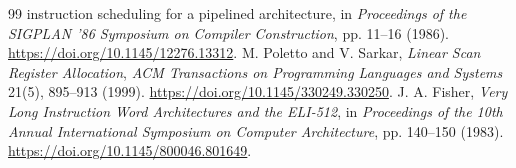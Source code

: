 \documentclass[11pt,a4paper]{article}
\begin{document}
\begin{thebibliography}{99}
{instruction scheduling for a pipelined architecture}, in \emph{Proceedings of the
SIGPLAN '86 Symposium on Compiler Construction}, pp. 11--16 (1986).
\url{https://doi.org/10.1145/12276.13312}.
 M. Poletto and V. Sarkar, \emph{Linear Scan Register
Allocation}, \emph{ACM Transactions on Programming Languages and Systems} 21(5),
895--913 (1999). \url{https://doi.org/10.1145/330249.330250}.
 J. A. Fisher, \emph{Very Long Instruction Word
Architectures and the ELI-512}, in \emph{Proceedings of the 10th Annual
International Symposium on Computer Architecture}, pp. 140--150 (1983).
\url{https://doi.org/10.1145/800046.801649}.
\end{thebibliography}
\end{document}
